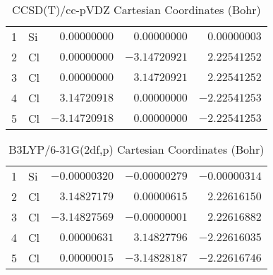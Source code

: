 \documentclass[10pt,oneside]{article}
\begin{document}
\begin{table}[h!]
\centering
\caption{CCSD(T)/cc-pVDZ Cartesian Coordinates (Bohr)}
\begin{tabular}{llrrr}
1  & Si & $ 0.00000000$ & $ 0.00000000$ & $ 0.00000003$ \\
2  & Cl & $ 0.00000000$ & $-3.14720921$ & $ 2.22541252$ \\
3  & Cl & $ 0.00000000$ & $ 3.14720921$ & $ 2.22541252$ \\
4  & Cl & $ 3.14720918$ & $ 0.00000000$ & $-2.22541253$ \\
5  & Cl & $-3.14720918$ & $ 0.00000000$ & $-2.22541253$ \\
\end{tabular}
\end{table}

\begin{table}[h!]
\centering
\caption{B3LYP/6-31G(2df,p) Cartesian Coordinates (Bohr)}
\begin{tabular}{llrrr}
1  & Si & $-0.00000320$ & $-0.00000279$ & $-0.00000314$ \\
2  & Cl & $ 3.14827179$ & $ 0.00000615$ & $ 2.22616150$ \\
3  & Cl & $-3.14827569$ & $-0.00000001$ & $ 2.22616882$ \\
4  & Cl & $ 0.00000631$ & $ 3.14827796$ & $-2.22616035$ \\
5  & Cl & $ 0.00000015$ & $-3.14828187$ & $-2.22616746$ \\
\end{tabular}
\end{table}

\clearpage
\end{document}

